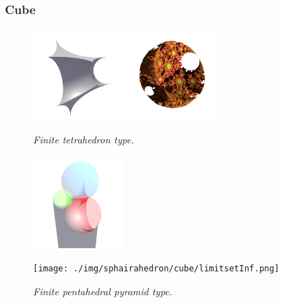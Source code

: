 \documentclass[suppldata, dvipdfmx]{interact}
\theoremstyle{plain}%
\theoremstyle{definition}
\theoremstyle{remark}
\theoremstyle{problemstyle}
\begin{document}
\subsubsection{Cube}
\begin{figure}[H]
 \begin{minipage}{0.5\textwidth}
  \begin{minipage}[t]{0.24\textwidth}
   \centering
   \includegraphics[width=1.35in, height=1.35in,
   keepaspectratio]{./img/sphairahedron/cube/sphairahedronFinite.png}
  \end{minipage}
  \hspace*{\fill}
  \begin{minipage}[t]{0.24\textwidth}
   \centering
   \includegraphics[width=1.35in, height=1.35in,
   keepaspectratio]{./img/sphairahedron/cube/limitsetFinite.png}
  \end{minipage}
  \hspace*{\fill}
  \caption{\textit{Finite tetrahedron type.}}
  \label{fig:cubeFinite}
 \end{minipage}
 \hspace*{\fill}
 \begin{minipage}{0.5\textwidth}
  \begin{minipage}[t]{0.24\textwidth}
   \centering
   \includegraphics[width=1.35in, height=1.35in,
   keepaspectratio]{./img/sphairahedron/cube/sphairahedronInf.png}
  \end{minipage}
  \hspace*{\fill}
  \begin{minipage}[t]{0.24\textwidth}
   \centering
   \texttt{[image: ./img/sphairahedron/cube/limitsetInf.png]} 
  \end{minipage}
  \hspace*{\fill}
  \caption{\textit{Finite pentahedral pyramid type.}}
  \label{fig:cubeInf}
 \end{minipage}
\end{figure}
\end{document}
